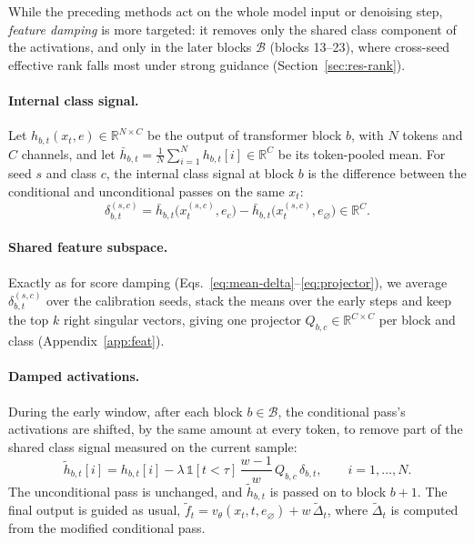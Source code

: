 \documentclass[sigconf,nonacm]{acmart}
\newcommand{\ind}[1]{\mathbb{1}[#1]}
\begin{document}
While the preceding methods act on the whole model input or denoising step, \emph{feature damping} is more targeted: it removes only the shared class component of the activations, and only in the later blocks $\mathcal{B}$ (blocks 13--23), where cross-seed effective rank falls most under strong guidance (Section~\ref{sec:res-rank}).

\paragraph{Internal class signal.}
Let $h_{b,t}(x_t, e) \in \mathbb{R}^{N \times C}$ be the output of transformer block $b$, with $N$ tokens and $C$ channels, and let $\bar{h}_{b,t} = \frac{1}{N} \sum_{i=1}^{N} h_{b,t}[i] \in \mathbb{R}^{C}$ be its token-pooled mean. For seed $s$ and class $c$, the internal class signal at block $b$ is the difference between the conditional and unconditional passes on the same $x_t$:
\begin{equation}
  \delta_{b,t}^{(s,c)} = \bar{h}_{b,t}\big(x_t^{(s,c)}, e_c\big) - \bar{h}_{b,t}\big(x_t^{(s,c)}, e_\varnothing\big)
  \in \mathbb{R}^{C} .
  \label{eq:feat-signal}
\end{equation}

\paragraph{Shared feature subspace.}
Exactly as for score damping (Eqs.~\eqref{eq:mean-delta}--\eqref{eq:projector}), we average $\delta_{b,t}^{(s,c)}$ over the calibration seeds, stack the means over the early steps and keep the top $k$ right singular vectors, giving one projector $Q_{b,c} \in \mathbb{R}^{C \times C}$ per block and class (Appendix~\ref{app:feat}).

\paragraph{Damped activations.}
During the early window, after each block $b \in \mathcal{B}$, the conditional pass's activations are shifted, by the same amount at every token, to remove part of the shared class signal measured on the current sample:
\begin{equation}
  \tilde{h}_{b,t}[i] = h_{b,t}[i] - \lambda\, \ind{t < \tau}\, \frac{w-1}{w}\,
  Q_{b,c}\, \delta_{b,t},
  \qquad i = 1, \dots, N .
  \label{eq:feat-damp}
\end{equation}
The unconditional pass is unchanged, and $\tilde{h}_{b,t}$ is passed on to block $b+1$. The final output is guided as usual, $\tilde{f}_t = v_\theta(x_t, t, e_\varnothing) + w\,\tilde{\Delta}_t$, where $\tilde{\Delta}_t$ is computed from the modified conditional pass.
\end{document}
